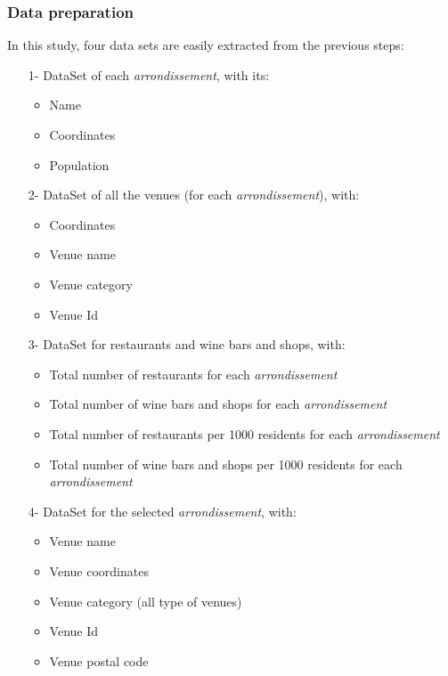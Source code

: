 \documentclass[english]{article}
\begin{document}
	\subsubsection{Data preparation}
	In this study, four data sets are easily extracted from the previous steps:
	\begin{itemize}
		\item[1-] DataSet of each \textit{arrondissement}, with its:
		\begin{itemize}
			\item Name
			\item Coordinates
			\item Population
		\end{itemize}
		\item[2-] DataSet of all the venues (for each \textit{arrondissement}), with:
		\begin{itemize}
			\item Coordinates
			\item Venue name
			\item Venue category
			\item Venue Id
		\end{itemize}
		\item[3-] DataSet for restaurants and wine bars and shops, with:
		\begin{itemize}
			\item Total number of restaurants for each \textit{arrondissement}
			\item Total number of wine bars and shops for each \textit{arrondissement}
			\item Total number of restaurants per 1000 residents for each \textit{arrondissement}
			\item Total number of wine bars and shops per 1000 residents for each \textit{arrondissement}
		\end{itemize}
		\item[4-] DataSet for the selected \textit{arrondissement}, with:
		\begin{itemize}
			\item Venue name 
			\item Venue coordinates
			\item Venue category (all type of venues)
			\item Venue Id
			\item Venue postal code
		\end{itemize}
	\end{itemize}
\end{document}
